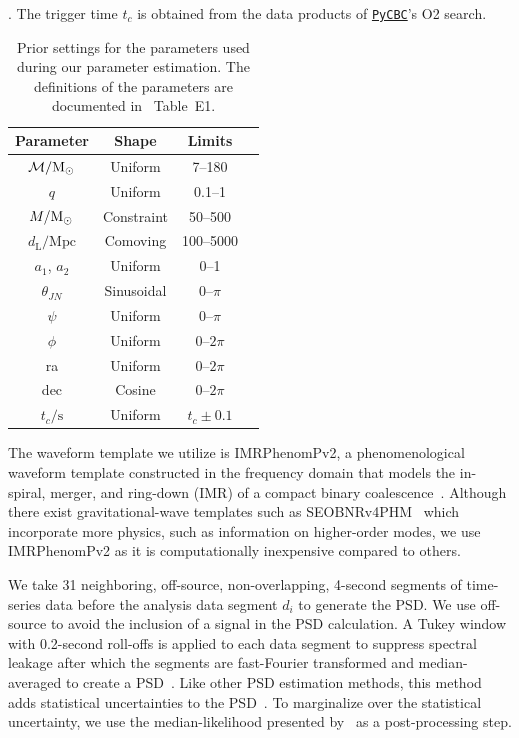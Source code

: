 \documentclass[%
 nofootinbib,
 amsmath,amssymb,
 aps,
 twocolumn,
 superscriptaddress
]{revtex4-2}
\newcommand{\imrphenomp}{{\sc IMRPhenomPv2}\xspace}
\newcommand{\seob}{{\sc SEOBNRv4PHM}\xspace}
\newcommand{\pycbc}{{\sc \href{https://pycbc.org/}{\texttt{PyCBC}}}\xspace}
\newcommand{\mathcmd}[1]{{\sc \relax\ifmmode#1\else $#1$\fi}\xspace}
\newcommand{\msun}{\mathcmd{\text{M}_\odot}}
\begin{document}
\begin{table}
    \centering
    \caption{
    Prior settings for the parameters used during our parameter estimation. The definitions of the parameters are documented in \citet{bilby_gwtc}~Table~E1.\label{tab:priors}}. The trigger time $t_c$ is obtained from the data products of \pycbc's O2 search.
    \begin{tabular}{c c c c}
    \hline
    Parameter & Shape & Limits \\
    \hline
          $\mathcal{M}/\msun$           & Uniform & 7--180  \\
          $q$                           & Uniform & 0.1--1  \\
          $M/\msun$                     & Constraint & 50--500  \\
          $d_\mathrm{L}/\mathrm{Mpc}$   & Comoving & 100--5000  \\
          $a_1$, $a_2$                  & Uniform & 0--1  \\
          $\theta_{JN}$                 & Sinusoidal & 0--$\pi$  \\
          $\psi$                        & Uniform & 0--$\pi$  \\
          $\phi$                        & Uniform & 0--$2\pi$  \\
          ra                            & Uniform & 0--$2\pi$  \\
          dec                           & Cosine & 0--$2\pi$  \\
          $t_c/\mathrm{s}$              & Uniform & $t_c\pm0.1$  \\
    \hline
    \end{tabular}
\end{table}

The waveform template we utilize is \imrphenomp, a phenomenological waveform template constructed in the frequency domain that models the in-spiral, merger, and ring-down (IMR) of a compact binary coalescence~\citep{khan2016frequency}. Although there exist gravitational-wave templates such as \seob~\cite{seobnrv4phm} which incorporate more physics, such as information on higher-order modes, we use \imrphenomp as it is computationally inexpensive compared to others.

We take 31 neighboring, off-source, non-overlapping, 4-second segments of time-series data before the analysis data segment $d_i$ to generate the PSD. We use off-source to avoid the inclusion of a signal in the PSD calculation. A Tukey window with 0.2-second roll-offs is applied to each data segment to suppress spectral leakage after which the segments are fast-Fourier transformed and median-averaged to create a PSD~\cite{ligo_psd}. Like other PSD estimation methods, this method adds statistical uncertainties to the PSD~\cite{psd_student_t, chatziioannou2019noise}. To marginalize over the statistical uncertainty, we use the median-likelihood presented by~\citet{psd_student_t} as a post-processing step. 
\end{document}
